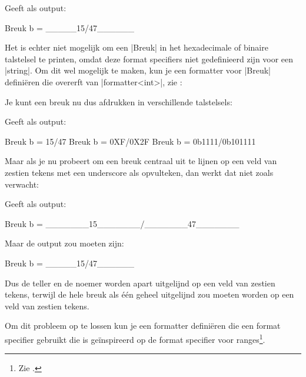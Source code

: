 \begin{cpplstShortInline}
Geeft als output:
\begin{coutput}
Breuk b = _____15/47______
\end{coutput}

Het is echter niet mogelijk om een |Breuk| in het hexadecimale of binaire talstelsel te printen, omdat deze format specifiers niet gedefinieerd zijn voor een |string|.
Om dit wel mogelijk te maken, kun je een formatter voor |Breuk| definiëren die overerft van |formatter<int>|, zie :

Je kunt een breuk nu dus afdrukken in verschillende talstelsels:

Geeft als output:
\begin{coutput}
Breuk b = 15/47
Breuk b = 0XF/0X2F
Breuk b = 0b1111/0b101111
\end{coutput}

Maar als je nu probeert om een breuk centraal uit te lijnen op een veld van zestien tekens met een underscore als opvulteken, dan werkt dat niet zoals verwacht:

Geeft als output:
\begin{coutput}
Breuk b = _______15_______/_______47_______
\end{coutput}

Maar de output zou moeten zijn:
\begin{coutput}
Breuk b = _____15/47______
\end{coutput}

Dus de teller en de noemer worden apart uitgelijnd op een veld van zestien tekens, terwijl de hele breuk als één geheel uitgelijnd zou moeten worden op een veld van zestien tekens.

Om dit probleem op te lossen kun je een formatter definiëren die een format specifier gebruikt die is geïnspireerd op de format specifier voor ranges\footnote{%
	Zie .
}.


\end{cpplstShortInline}
